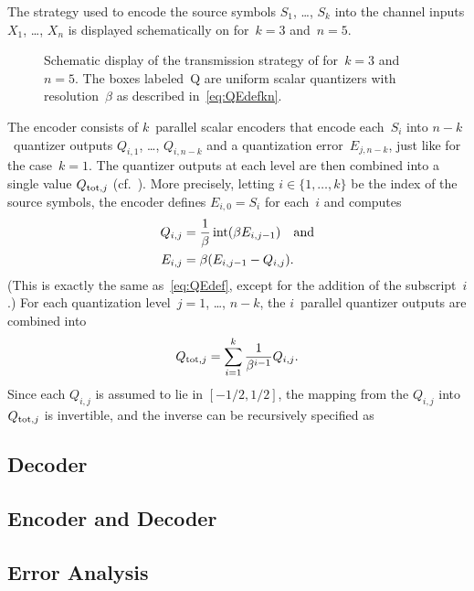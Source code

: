 The strategy used to encode the source symbols $S_1$, \dots, $S_k$ into the
channel inputs $X_1$, \dots, $X_n$ is displayed schematically on
 for~$k=3$ and~$n=5$. 
\begin{figure}[tbp]
  \begin{center}
    
  \end{center}
  \caption{Schematic display of the transmission strategy of 
  for~$k = 3$ and~$n=5$. The boxes labeled~\textsf{Q} are uniform scalar
  quantizers with resolution~$\beta$ as described in~\eqref{eq:QEdefkn}.}
  \label{fig:knencoding}
\end{figure}
The encoder consists of $k$~parallel scalar encoders that encode each~$S_i$ into
$n-k$~quantizer outputs $Q_{i,1}$, \dots, $Q_{i,n-k}$ and a quantization
error~$E_{j,n-k}$, just like for the case~$k=1$. The quantizer outputs at each
level are then combined into a single value $Q_{\operatorname{tot},j}$
(cf.~). More precisely, letting $i \in \{1, \dots, k\}$ be
the index of the source symbols, the encoder defines $E_{i,0} = S_i$ for
each~$i$ and computes
\begin{align}
  Q_{i,j} &= \frac{1}{\beta} \operatorname{int}(\beta E_{i,j-1}) \quad\text{and} \nonumber \\
  E_{i,j} &= \beta(E_{i,j-1} - Q_{i,j}). \label{eq:QEdefkn}
\end{align}
(This is exactly the same as~\eqref{eq:QEdef}, except for the addition of the
subscript~$i$.) For each quantization level~$j = 1$, \dots, $n-k$, the
$i$~parallel quantizer outputs are combined into
\begin{equation*}
  Q_{\operatorname{tot},j} = \sum_{i=1}^k \frac{1}{\beta^{i-1}} Q_{i,j}.
\end{equation*}
Since each $Q_{i,j}$ is assumed to lie in $[-1/2, 1/2]$, the mapping from the
$Q_{i,j}$ into~$Q_{\operatorname{tot},j}$ is invertible, and the inverse can be recursively
specified as

\subsection{Decoder}



\subsection{Encoder and Decoder}


\subsection{Error Analysis}



